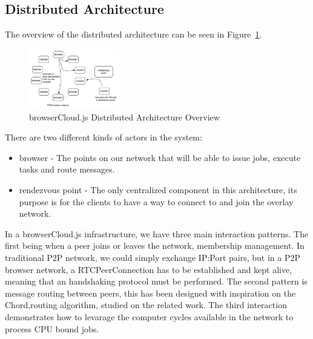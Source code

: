 \subsection{Distributed Architecture}

The overview of the distributed architecture can be seen in Figure~\ref{fig:n-a-o}.

\begin{figure}[h!]
  \centering
  \includegraphics[width=0.35\textwidth]{figs/network-architecture-overview}
  \caption{browserCloud.js Distributed Architecture Overview}
  \label{fig:n-a-o}
\end{figure}


There are two different kinds of actors in the system:

\begin{itemize}
    \item browser - The points on our network that will be able to issue jobs, execute tasks and route messages.
    \item rendezvous point - The only centralized component in this architecture, its purpose is for the clients to have a way to connect to and join the overlay network.
\end{itemize}


In a browserCloud.js infrastructure, we have three main interaction patterns. The first being when a peer joins or leaves the network, membership management. In traditional P2P network, we could simply exchange IP:Port pairs, but in a P2P browser network, a RTCPeerConnection has to be established and kept alive, meaning that an handshaking protocol must be performed. The second pattern is message routing between peers, this has been designed with inspiration on the Chord\cite{Stoica2001},routing algorithm, studied on the related work. The third interaction demonstrates how to levarage the computer cycles available in the network to process CPU bound jobs.

